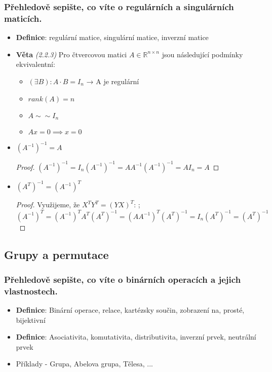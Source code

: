 \documentclass[10pt,a4paper]{article}
\begin{document}
{\begin{itemize}[label=$\circ$]
\end{itemize}

\subsubsection{Přehledově sepište, co víte o regulárních a singulárních maticích.}

\begin{itemize}[label=$\circ$]
    \item \textbf{Definice}: regulární matice, singulární matice, inverzní matice
    \item \textbf{Věta} \textit{(2.2.3)} Pro čtvercovou matici $A\in \mathbb{R}^{n\times n}$ jsou následující podmínky ekvivalentní:
\begin{itemize}
\item $(\exists B): A\cdot B = I_n$ → A je regulární
\item $rank(A) = n$  
\item $A \sim\sim I_n$
\item $Ax = 0 \implies x = 0$
\end{itemize}

\item $(A^{-1})^{-1} = A$
\begin{proof}
$(A^{-1})^{-1} = I_n (A^{-1})^{-1}  = A A^{-1}(A^{-1})^{-1} = A I_n = A$
\end{proof}
\item $(A^T)^{-1} =(A^{-1})^T$
\begin{proof}
Využijeme, že $X^T Y^T = (YX)^T$:
;
$(A^{-1})^T = (A^{-1})^T A^T (A^T)^{-1} =(AA^{-1})^T  (A^T)^{-1} =  I_n (A^T)^{-1} = (A^T)^{-1} $
\end{proof}
\end{itemize}

\subsection{Grupy a permutace}
\subsubsection{Přehledově sepište, co víte o binárních operacích a jejich vlastnostech.}

\begin{itemize}[label=$\circ$]
\item \textbf{Definice}: Binární operace, relace, kartézsky součin, zobrazení na, prosté, bijektivní
\item \textbf{Definice}: Asociativita, komutativita, distributivita, inverzní prvek, neutrální prvek
\item Příklady - Grupa, Abelova grupa, Tělesa, ...
\end{itemize}


}
\end{document}
